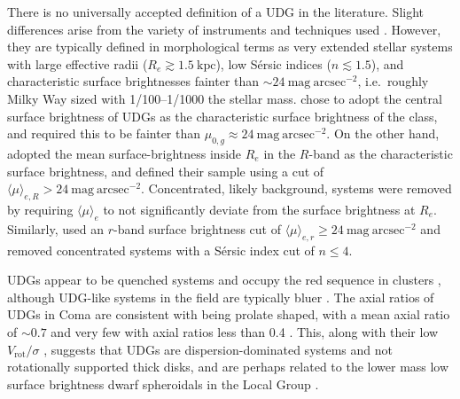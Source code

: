 \documentclass[iop,tighten,twocolumn,apj,floatfix]{emulateapj}
\begin{document}
There is no universally accepted definition of a UDG in the literature.
Slight differences arise from the variety of instruments and techniques used
\citep{martin2019}.
However, they are typically defined in morphological terms as very extended
stellar systems with large effective radii ($R_e \gtrsim 1.5~\mathrm{kpc}$),
low S\'{e}rsic indices ($n \lesssim 1.5$), and characteristic surface
brightnesses fainter than ${\sim}24~\mathrm{mag}~\mathrm{arcsec}^{-2}$, i.e.\
roughly Milky Way sized with 1/100--1/1000 the stellar mass.
\cite{vandokkum2015a} chose to adopt the central surface brightness of UDGs as
the characteristic surface brightness of the class, and required this to be
fainter than $\mu_{0,g} \approx 24~\mathrm{mag}~\mathrm{arcsec}^{-2}$.
On the other hand, \cite{koda2015} adopted the mean surface-brightness inside
$R_e$ in the $R$-band as the characteristic surface brightness, and defined
their sample using a cut of $\langle\mu\rangle_{e,R} >
24~\mathrm{mag}~\mathrm{arcsec}^{-2}$.
Concentrated, likely background, systems were removed by requiring
$\langle\mu\rangle_e$ to not significantly deviate from the surface brightness
at $R_e$.
Similarly, \cite{vdb2016} used an $r$-band surface brightness cut of
$\langle\mu\rangle_{e,r} \geq 24~\mathrm{mag}~\mathrm{arcsec}^{-2}$ and removed
concentrated systems with a S\'{e}rsic index cut of $n \leq 4$.

UDGs appear to be quenched systems and occupy the red sequence in clusters
\citep{vandokkum2015a, vdb2016}, although UDG-like systems in the field are typically bluer
\citep[e.g.][]{leisman2017, roman2017b}.
The axial ratios of UDGs in Coma are consistent with being prolate shaped,
with a mean axial ratio of ${\sim}0.7$ and very few with axial ratios less
than 0.4 \citetext{\citealp{burkert2017}, but see \citealp{rong2019}}.
This, along with their low $V_\mathrm{rot}/\sigma$ \citep{vandokkum2019b},
suggests that UDGs are dispersion-dominated systems and not rotationally
supported thick disks, and are perhaps related to the lower mass low surface
brightness dwarf spheroidals in the Local Group \citep{burkert2017}.
\end{document}
